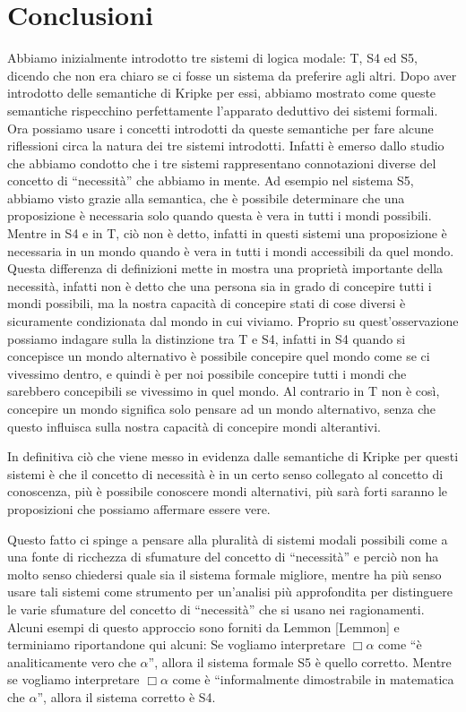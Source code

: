 \documentclass[a4paper, titlepage, 12pt]{report}
\begin{document}
\chapter*{Conclusioni}
Abbiamo inizialmente introdotto tre sistemi di logica modale: T, S4 ed S5,
dicendo che non era chiaro se ci fosse un sistema da preferire agli altri.
Dopo aver introdotto delle semantiche di Kripke per essi, abbiamo mostrato
come queste semantiche rispecchino perfettamente l'apparato deduttivo dei sistemi formali.
Ora possiamo usare i concetti introdotti da queste semantiche per fare alcune riflessioni
circa la natura dei tre sistemi introdotti. Infatti è emerso dallo studio che abbiamo condotto
che i tre sistemi rappresentano connotazioni diverse del concetto di ``necessità''
che abbiamo in mente.
Ad esempio nel sistema S5, abbiamo visto grazie alla semantica, che è possibile
determinare che una proposizione è necessaria solo quando questa è vera in tutti i mondi
possibili. Mentre in S4 e in T, ciò non è detto, infatti in questi sistemi una proposizione
è necessaria in un mondo quando è vera in tutti i mondi accessibili da quel mondo.
Questa differenza di definizioni mette in mostra una proprietà importante della necessità,
infatti non è detto che una persona sia in grado di concepire tutti i mondi possibili,
ma la nostra capacità di concepire stati di cose diversi è sicuramente condizionata dal mondo
in cui viviamo. Proprio su quest'osservazione possiamo indagare sulla la distinzione tra T e S4,
infatti in S4 quando si concepisce un mondo alternativo è possibile concepire quel mondo
come se ci vivessimo dentro, e quindi è per noi possibile concepire tutti i mondi che sarebbero
concepibili se vivessimo in quel mondo. Al contrario in T non è così, concepire un mondo
significa solo pensare ad un mondo alternativo, senza che questo influisca sulla nostra capacità
di concepire mondi alterantivi.

In definitiva ciò che viene messo in evidenza dalle semantiche di Kripke per questi sistemi è
che il concetto di necessità è in un certo senso collegato al concetto di conoscenza, più
è possibile conoscere mondi alternativi, più sarà forti saranno le proposizioni che possiamo
affermare essere vere.

Questo fatto ci spinge a pensare alla pluralità di sistemi modali possibili
come a una fonte di ricchezza di sfumature del concetto di ``necessità'' e perciò non ha molto
senso chiedersi quale sia il sistema formale migliore, mentre ha più senso usare tali sistemi
come strumento per un'analisi più approfondita per distinguere le varie sfumature del concetto
di ``necessità'' che si usano nei ragionamenti.
Alcuni esempi di questo approccio sono forniti da Lemmon [Lemmon] e terminiamo riportandone qui alcuni:
Se vogliamo interpretare $\Box \alpha$ come ``è analiticamente vero che $\alpha$'', allora il sistema
formale S5 è quello corretto. Mentre se vogliamo interpretare $\Box \alpha$ come
è ``informalmente dimostrabile in matematica che $\alpha$'', allora il sistema corretto è S4.
\end{document}
